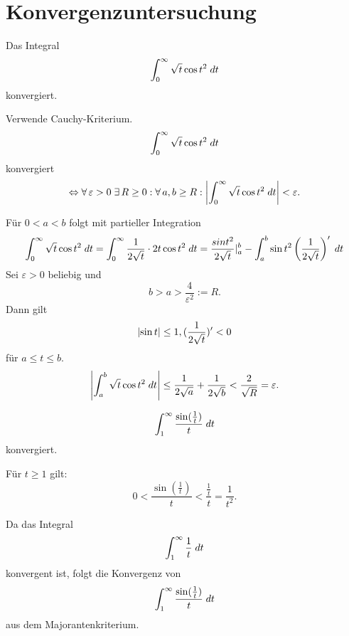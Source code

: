 \documentclass[../ana2u.tex]{subfiles}
\begin{document}
\setcounter{section}{5}
\section{Konvergenzuntersuchung}
\begin{beh}
    Das Integral 
    \[ \integralx{\sqrt{t} \cos t^2}{0}{\infty}{t} \]
    konvergiert.
\end{beh}
\begin{bew}
    Verwende Cauchy-Kriterium. 
    \[ \integralx{\sqrt{t} \cos t^2}{0}{\infty}{t} \] 
    konvergiert 
    \[ \Leftrightarrow \forall \varepsilon > 0 \;\exists 
    R \geq 0 : \forall a,b \geq R: 
    \abs{ \integralx{\sqrt{t} \cos t^2}{0}{\infty}{t} }
    < \varepsilon. \]

    Für \( 0 < a < b \) folgt mit partieller Integration
    \[ \integralx{\sqrt{t} \cos t^2}{0}{\infty}{t}
    = \integralx{\frac{1}{2\sqrt{t}} \cdot 2t \cos t^2}{0}{\infty}{t} 
    = \frac{sin t^2}{2\sqrt{t}} \vert_a^b - 
    \integralx{\sin t^2 \left( \frac{1}{2\sqrt{t}} \right)'}{a}{b}{t} \]
    Sei \( \varepsilon > 0 \) beliebig und 
    \[ b > a > \frac{4}{\varepsilon^2} := R. \]
    Dann gilt 
    \[ \abs{\sin t} \leq 1, (\frac{1}{2\sqrt{t}})' < 0 \]
    für \( a \leq t \leq b \).
    \[ \abs{ \integralx{\sqrt{t}\cos t^2 }{a}{b}{t} }
    \leq \frac{1}{2\sqrt{a}} + \frac{1}{2\sqrt{b}} 
    < \frac{2}{\sqrt{R}} = \varepsilon. \]
\end{bew}
\begin{beh}
    \[ \integralx{\frac{\sin(\frac{1}{t})}{t}}{1}{\infty}{t} \]
    konvergiert.
\end{beh}
\begin{bew}
    Für \( t \geq 1 \) gilt: 
    \[ 0 < \frac{\sin(\frac{1}{t})}{t} 
    < \frac{\frac{1}{t}}{t} = \frac{1}{t^2}. \]

    Da das Integral 
    \[ \integralx{\frac{1}{t}}{1}{\infty}{t} \]
    konvergent ist, folgt die Konvergenz von
    \[ \integralx{\frac{\sin(\frac{1}{t})}{t}}{1}{\infty}{t} \]
    aus dem Majorantenkriterium.
\end{bew}
\end{document}
